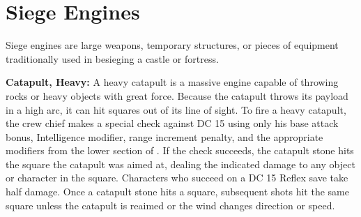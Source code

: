 \section{Siege Engines}
Siege engines are large weapons, temporary structures, or pieces of equipment traditionally used in besieging a castle or fortress.




\textbf{Catapult, Heavy:} A heavy catapult is a massive engine capable of throwing rocks or heavy objects with great force. Because the catapult throws its payload in a high arc, it can hit squares out of its line of sight. To fire a heavy catapult, the crew chief makes a special check against DC 15 using only his base attack bonus, Intelligence modifier, range increment penalty, and the appropriate modifiers from the lower section of . If the check succeeds, the catapult stone hits the square the catapult was aimed at, dealing the indicated damage to any object or character in the square. Characters who succeed on a DC 15 Reflex save take half damage. Once a catapult stone hits a square, subsequent shots hit the same square unless the catapult is reaimed or the wind changes direction or speed.

